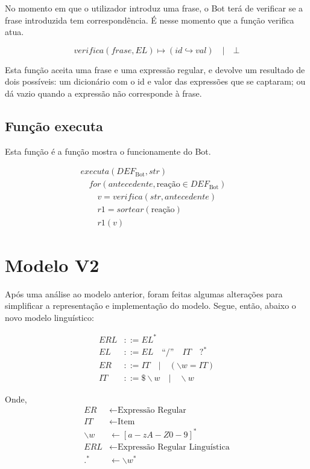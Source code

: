\documentclass[11pt]{article} %
\begin{document}
\hspace{11pt} No momento em que o utilizador introduz uma frase, o Bot terá de verificar se a frase introduzida tem correspondência. É nesse momento que a função verifica atua.

$$
verifica(frase, EL) \mapsto (id \hookrightarrow val) \quad | \quad \bot
$$

Esta função aceita uma frase e uma expressão regular, e devolve um resultado de dois possíveis: um dicionário com o id e valor das expressões que se captaram; ou dá vazio quando a expressão não corresponde à frase.


\subsection{Função executa}

\hspace{11pt} Esta função é a função mostra o funcionamente do Bot.

\begin{align*}
&executa(DEF_{\text{Bot}}, str) && \\
& \quad for(antecedente, \text{reação} \in DEF_{\text{Bot}}) && \\
& \qquad v = verifica(str, antecedente) && \\
& \qquad r1 = sortear(\text{reação}) && \\
& \qquad r1(v) &&
\end{align*}


\section{Modelo V2}

\hspace{11pt} Após uma análise ao modelo anterior, foram feitas algumas alterações para simplificar a representação e implementação do modelo. Segue, então, abaixo o novo modelo linguístico:

\begin{align*}
ERL &::= EL^* \\
EL &::= EL \quad \text{``/''} \quad IT \quad ?^* \\
ER &::= IT \quad | \quad (\backslash w = IT) \\
IT &::= \$ \backslash w \quad | \quad \backslash w
\end{align*}

Onde,
\begin{align*}
ER &\leftarrow \text{Expressão Regular}\\
IT &\leftarrow \text{Item}\\
\backslash w &\leftarrow [a-zA-Z0-9]^* \\
ERL &\leftarrow \text{Expressão Regular Linguística}\\
.^* &\leftarrow \backslash w^*
\end{align*}
\end{document}
